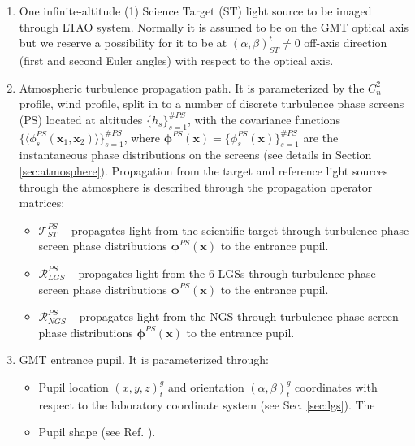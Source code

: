 \begin{enumerate}
	\item One infinite-altitude (1) Science Target (ST) light source to be
	imaged through LTAO
	system. Normally it is assumed to be on the GMT optical axis but we reserve
	a possibility for it to be at $(\alpha,\beta)^{t}_{ST} \neq 0$ off-axis
	direction (first and second Euler angles) with respect to the optical axis.

	\item Atmospheric turbulence propagation path. It is parameterized by the
	$C_{n}^{2}$ profile, wind profile, split in to a number of discrete
	turbulence phase screens (PS) located at altitudes
	$\{ h_{s} \}_{s=1}^{\#PS}$, with the covariance functions
	$\{ \langle \phi^{PS}_{s}(\bm{x}_{1},\bm{x}_{2}) \rangle \}_{s=1}^{\#PS}$,
	where $\bm{\phi}^{PS} (\bm{x}) = \{ \phi^{PS}_{s}(\bm{x}) \}_{s=1}^{\#PS}$
	are the instantaneous phase distributions on the
	screens (see details in Section \ref{sec:atmosphere}).
	Propagation from the target and reference light sources through the
	atmosphere is described through the propagation operator matrices:
	\begin{itemize}
		\item $\mathcal{T}_{ST}^{PS}$ -- propagates light from the scientific
		target through turbulence phase screen phase distributions
		$\bm{\phi}^{PS}(\bm{x})$ to the entrance pupil.
		\item $\mathcal{R}_{LGS}^{PS}$ -- propagates light from the 6 LGSs
		through turbulence phase screen phase distributions
		$\bm{\phi}^{PS}(\bm{x})$ to the entrance pupil.
		\item $\mathcal{R}_{NGS}^{PS}$ -- propagates light from the NGS
		through turbulence phase screen phase distributions
		$\bm{\phi}^{PS}(\bm{x})$ to the entrance pupil.
	\end{itemize}

	\item GMT entrance pupil. It is parameterized through:
	\begin{itemize}
		\item Pupil location $(x,y,z)^{g}_{t}$ and orientation
		$(\alpha,\beta)_{t}^{g}$ coordinates with respect to the
		laboratory coordinate system (see Sec. \ref{sec:lgs}). The
		\item Pupil shape (see Ref. \cite{ConanGMTmath}).
	\end{itemize}


\end{enumerate}
